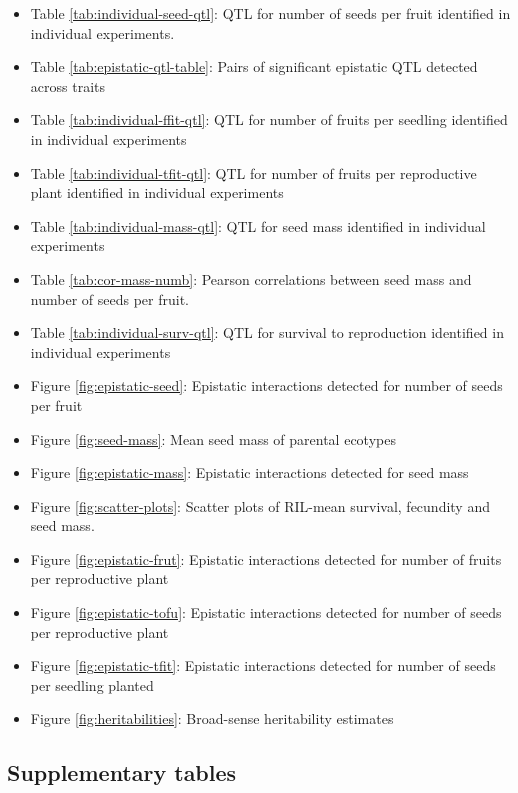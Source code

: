 \documentclass[]{article}
\providecommand{\tightlist}{%
  \setlength{\itemsep}{0pt}\setlength{\parskip}{0pt}}
\begin{document}
\begin{itemize}
\tightlist
\item
  Table \ref{tab:individual-seed-qtl}: QTL for number of seeds per fruit identified in individual experiments.
\item
  Table \ref{tab:epistatic-qtl-table}: Pairs of significant epistatic QTL detected across traits
\item
  Table \ref{tab:individual-ffit-qtl}: QTL for number of fruits per seedling identified in individual experiments
\item
  Table \ref{tab:individual-tfit-qtl}: QTL for number of fruits per reproductive plant identified in individual experiments
\item
  Table \ref{tab:individual-mass-qtl}: QTL for seed mass identified in individual experiments
\item
  Table \ref{tab:cor-mass-numb}: Pearson correlations between seed mass and number of seeds per fruit.
\item
  Table \ref{tab:individual-surv-qtl}: QTL for survival to reproduction identified in individual experiments
\item
  Figure \ref{fig:epistatic-seed}: Epistatic interactions detected for number of seeds per fruit
\item
  Figure \ref{fig:seed-mass}: Mean seed mass of parental ecotypes
\item
  Figure \ref{fig:epistatic-mass}: Epistatic interactions detected for seed mass
\item
  Figure \ref{fig:scatter-plots}: Scatter plots of RIL-mean survival, fecundity and seed mass.
\item
  Figure \ref{fig:epistatic-frut}: Epistatic interactions detected for number of fruits per reproductive plant
\item
  Figure \ref{fig:epistatic-tofu}: Epistatic interactions detected for number of seeds per reproductive plant
\item
  Figure \ref{fig:epistatic-tfit}: Epistatic interactions detected for number of seeds per seedling planted
\item
  Figure \ref{fig:heritabilities}: Broad-sense heritability estimates
\end{itemize}

\newpage

\hypertarget{supplementary-tables}{%
\subsection{Supplementary tables}\label{supplementary-tables}}
\end{document}
